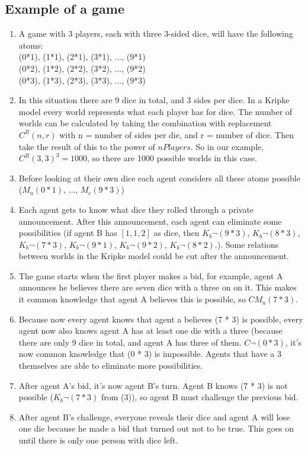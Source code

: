 \documentclass{article}
\begin{document}
\subsection*{Example of a game}
\begin{enumerate}
    \item A game with 3 players, each with three 3-sided dice, will have the following atoms:\\
    (0*1), (1*1), (2*1), (3*1), ..., (9*1)\\
    (0*2), (1*2), (2*2), (3*2), ..., (9*2)\\
    (0*3), (1*3), (2*3), (3*3), ..., (9*3)\\
    \item In this situation there are 9 dice in total, and 3 sides per dice. In a Kripke model every world represents what each player has for dice. The number of worlds can be calculated by taking the combination with replacement $C^R(n,r)$ with n = number of sides per die, and r = number of dice. Then take the result of this to the power of $nPlayers$. So in our example, $C^R(3,3)^3 = 1000$, so there are 1000 possible worlds in this case.
    \item Before looking at their own dice each agent considers all these atoms possible ($M_a(0*1)$, ..., $M_c(9*3)$)
    \item Each agent gets to know what dice they rolled through a private announcement. After this announcement, each agent can eliminate some possibilities (if agent B has $[1, 1, 2]$ as dice, then $K_b \neg (9 * 3)$, $K_b \neg (8 * 3)$, $K_b \neg (7 * 3)$, $K_b \neg (9 * 1)$, $K_b \neg (9 * 2)$, $K_b \neg (8 * 2)$.). Some relations between worlds in the Kripke model could be cut after the announcement.
    \item The game starts when the first player makes a bid, for example, agent A announces he believes there are seven dice with a three on on it. This makes it common knowledge that agent A believes this is possible, so $CM_a(7 * 3)$.
    \item Because now every agent knows that agent a believes (7 * 3) is possible, every agent now also knows agent A has at least one die with a three (because there are only 9 dice in total, and agent A has three of them. $C \neg (0 * 3)$, it's now common knowledge that (0 * 3) is impossible. Agents that have a 3 themselves are able to eliminate more possibilities. 
    \item After agent A's bid, it's now agent B's turn. Agent B knows (7 * 3) is not possible ($K_b \neg (7 * 3)$ from (3)), so agent B must challenge the previous bid.
    \item After agent B's challenge, everyone reveals their dice and agent A will lose one die because he made a bid that turned out not to be true. This goes on until there is only one person with dice left.
\end{enumerate}
\end{document}
